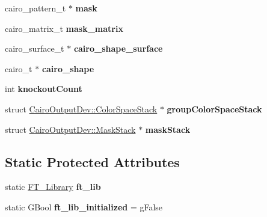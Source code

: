 \begin{DoxyCompactItemize}
cairo\+\_\+pattern\+\_\+t $\ast$ {\bfseries mask}
\item 
\mbox{\label{class_cairo_output_dev_a6565d35477771718941df2912b055340}} 
cairo\+\_\+matrix\+\_\+t {\bfseries mask\+\_\+matrix}
\item 
\mbox{\label{class_cairo_output_dev_ad8893e21b410b5612aec6b8a1d2c4fdb}} 
cairo\+\_\+surface\+\_\+t $\ast$ {\bfseries cairo\+\_\+shape\+\_\+surface}
\item 
\mbox{\label{class_cairo_output_dev_a61558aa0a405a27bae168ecc92c71dd9}} 
cairo\+\_\+t $\ast$ {\bfseries cairo\+\_\+shape}
\item 
\mbox{\label{class_cairo_output_dev_ab7ccde7ceb6d2a00845d039b530f9bdc}} 
int {\bfseries knockout\+Count}
\item 
\mbox{\label{class_cairo_output_dev_aa94dda8dea5dcd3e711eb505fe283879}} 
struct \hyperlink{struct_cairo_output_dev_1_1_color_space_stack}{Cairo\+Output\+Dev\+::\+Color\+Space\+Stack} $\ast$ {\bfseries group\+Color\+Space\+Stack}
\item 
\mbox{\label{class_cairo_output_dev_ac7c0ca2c3b9da4a81ed1178456ea5352}} 
struct \hyperlink{struct_cairo_output_dev_1_1_mask_stack}{Cairo\+Output\+Dev\+::\+Mask\+Stack} $\ast$ {\bfseries mask\+Stack}
\end{DoxyCompactItemize}
\subsection*{Static Protected Attributes}
\begin{DoxyCompactItemize}
\item 
\mbox{\label{class_cairo_output_dev_a61ab076cd7bdd6e2e0ab8b22f17962d3}} 
static \hyperlink{struct_f_t___library_rec__}{F\+T\+\_\+\+Library} {\bfseries ft\+\_\+lib}
\item 
\mbox{\label{class_cairo_output_dev_a7f575db7b5b04c3d4b81eeb2b959a7ec}} 
static G\+Bool {\bfseries ft\+\_\+lib\+\_\+initialized} = g\+False
\end{DoxyCompactItemize}


